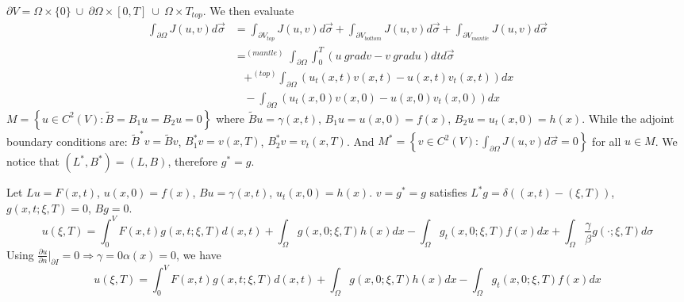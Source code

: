 \documentclass[a4paper, 11pt]{article}
\begin{document}
\begin{spacing}{1.5}
$\partial V = \Omega \times \{0\} \ \cup \ \partial \Omega \times [0,T] \ \cup \ \Omega \times T_{top}$. We then evaluate
\begin{align*}
\int_{\partial \Omega} J(u,v) d \vec{\sigma} 
& = \int_{\partial V_{top}} J(u,v) d \vec{\sigma} + \int_{\partial V_{bottom}} J(u,v) d \vec{\sigma} + \int_{\partial V_{mantle}} J(u,v) d \vec{\sigma} \\
& = ^{(mantle)} \int_{\partial \Omega} \int_{0}^{T} \left( u \ grad v- v \ grad u\right)  dt d\vec{\sigma} \\
& \ \ \ \ + ^{(top)} \int_{\partial \Omega} \left( u_t(x,t)  v(x,t) - u(x,t) v_t(x,t) \right) dx \\
& \ \ \ \ - \int_{\partial \Omega} \left( u_t(x,0) v(x,0) - u(x,0) v_t(x,0)\right) dx
\end{align*}
$
M =\left\lbrace u \in C^2(V) : \tilde{B} = B_1u = B_2u = 0\right\rbrace 
$ where $\tilde{B} u = \gamma(x,t)$, $B_1u = u(x,0) = f(x)$, $B_2u=u_t(x,0) = h(x)$. While the adjoint boundary conditions are: $\tilde{B}^* v = \tilde{B} v$, $B_1^*v = v(x,T)$, $B_2^*v=v_t(x,T)$. And $ M^* =\left\lbrace v \in C^2(V) :\int_{\partial \Omega} J(u,v) d \vec{\sigma} =0 \right\rbrace $
for all $u\in M$. We notice that $(L^*, B^*) = (L,B)$, therefore $g^* =g$.

Let $Lu = F(x,t)$, $u(x,0) = f(x)$, $Bu= \gamma(x,t)$, $u_t(x,0) = h(x)$. $v=g^*=g$ satisfies $L^*g = \delta \left( (x,t) - (\xi,T) \right)$, $g(x,t;\xi,T) =0 $, $Bg=0$.
$$
u(\xi,T) = \int_{0}^{V} F(x,t) g(x,t;\xi,T) d(x,t) + \int_{\Omega} g(x,0;\xi,T) h(x) dx - \int_{\Omega}g_t(x,0;\xi,T) f(x) dx + \int_{\Omega} \frac{\gamma}{\beta} g(\cdot;\xi,T) d\sigma
$$
Using $\frac{\partial u }{\partial n} \Big|_{\partial I} =0 \Rightarrow \gamma =0 \alpha(x) =0$, we have
$$
u(\xi,T) = \int_{0}^{V} F(x,t) g(x,t;\xi,T) d(x,t) + \int_{\Omega} g(x,0;\xi,T) h(x) dx - \int_{\Omega}g_t(x,0;\xi,T) f(x) dx
$$


\end{spacing}
\end{document}
